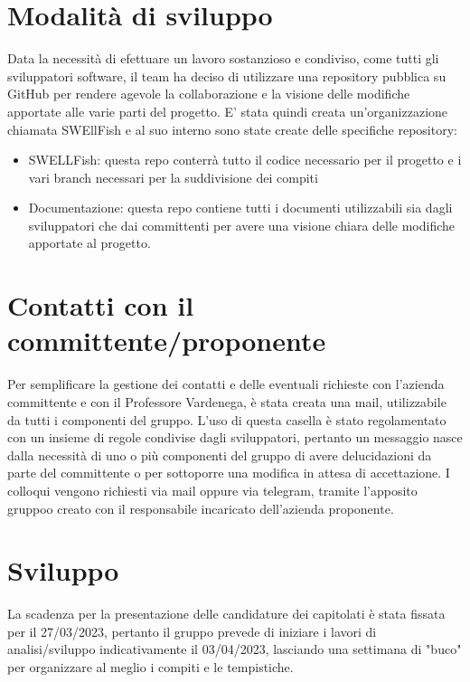 \documentclass[12pt]{article}
\begin{document}
\section{Modalità di sviluppo}
Data la necessità di efettuare un lavoro sostanzioso e condiviso, come tutti gli sviluppatori software, il team ha deciso di utilizzare una repository pubblica su GitHub per rendere agevole la collaborazione e la visione delle modifiche apportate alle varie parti del progetto.
E' stata quindi creata un'organizzazione chiamata SWEllFish e al suo interno sono state create delle specifiche repository:

\begin{itemize}
    \item SWELLFish: questa repo conterrà tutto il codice necessario per il progetto e i vari branch necessari per la suddivisione dei compiti
    \item Documentazione: questa repo contiene tutti i documenti utilizzabili sia dagli sviluppatori che dai committenti per avere una visione chiara delle modifiche apportate al progetto.
\end{itemize}

\section{Contatti con il committente/proponente}
Per semplificare la gestione dei contatti e delle eventuali richieste con l'azienda committente e con il Professore Vardenega, è stata creata una mail, \href{swellfish14@gmail.com}{} utilizzabile da tutti i componenti del gruppo.
L'uso di questa casella è stato regolamentato con un insieme di regole condivise dagli sviluppatori, pertanto un messaggio nasce dalla necessità di uno o più componenti del gruppo di avere delucidazioni da parte del committente o per sottoporre una modifica in attesa di accettazione.
I colloqui vengono richiesti via mail oppure via telegram, tramite l'apposito gruppoo creato con il responsabile incaricato dell'azienda proponente.

\section{Sviluppo}
La scadenza per la presentazione delle candidature dei capitolati è stata fissata per il 27/03/2023, pertanto il gruppo prevede di iniziare i lavori di analisi/sviluppo indicativamente il 03/04/2023, lasciando una settimana di "buco" per organizzare al meglio i compiti e le tempistiche.
\end{document}
